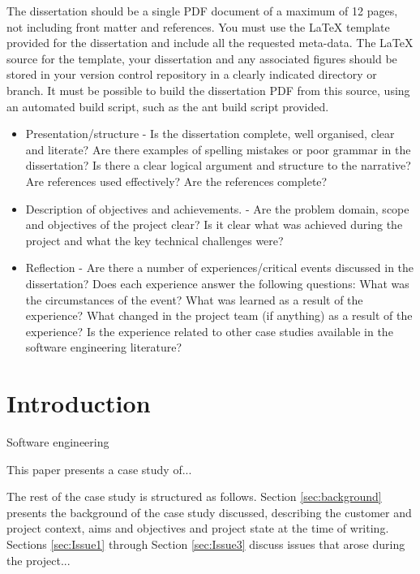 \documentclass{l3proj}
\begin{document}
The dissertation should be a single PDF document of a maximum of 12 pages, not including front matter and references. You must use the LaTeX template provided for the dissertation and include all the requested meta-data. The LaTeX source for the template, your dissertation and any associated figures should be stored in your version control repository in a clearly indicated directory or branch. It must be possible to build the dissertation PDF from this source, using an automated build script, such as the ant build script provided.

\begin{itemize}
\item Presentation/structure -  	Is the dissertation complete, well organised, clear and literate? Are there examples of spelling mistakes or poor grammar in the dissertation? Is there a clear logical argument and structure to the narrative? Are references used effectively? Are the references complete?
\item Description of objectives and achievements. - Are the problem domain, scope and objectives of the project clear? Is it clear what was achieved during the project and what the key technical challenges were?
\item Reflection -  	Are there a number of experiences/critical events discussed in the dissertation? Does each experience answer the following questions: What was the circumstances of the event? What was learned as a result of the experience? What changed in the project team (if anything) as a result of the experience? Is the experience related to other case studies available in the software engineering literature?
\end{itemize}

\section{Introduction}



Software engineering 

This paper presents a case study of... 

The rest of the case study is structured as follows.  Section
\ref{sec:background} presents the background of the case study
discussed, describing the customer and project context, aims and
objectives and project state at the time of writing.  Sections
\ref{sec:Issue1} through Section \ref{sec:Issue3} discuss issues that
arose during the project...
\end{document}
